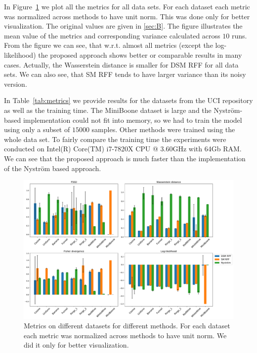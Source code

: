 In Figure~\ref{fig:metrics} we plot all the metrics for all data sets.
For each dataset each metric was normalized across methods to have unit norm.
This was done only for better visualization.
The original values are given in \ref{sec:B}.
The figure illustrates the mean value of the metrics and corresponding variance
calculated across $10$ runs.
From the figure we can see, that w.r.t. almost all metrics (except the log-likelihood)
the proposed approach shows better or comparable results in many cases.
Actually, the Wasserstein distance is smaller for DSM RFF for all data sets.
We can also see, that SM RFF tends to have larger variance than its noisy version.

In Table~\ref{tab:metrics} we provide results for the datasets from the UCI repository
as well as the training time.
The MiniBoone dataset is large and the Nystr\"om-based implementation
could not fit into memory, so we had to train the model using only a subset of
$15000$ samples.
Other methods were trained using the whole data set.
To fairly compare the training time the experiments were conducted on
Intel(R) Core(TM) i7-7820X CPU @ 3.60GHz with 64Gb RAM.
We can see that the proposed approach is much faster than the implementation
of the Nystr\"om based approach.


\begin{figure}[h]
  \centering
  \includegraphics[width=\textwidth]{figures/score_matching/exps/metrics.pdf}
  \caption{Metrics on different datasets for different methods.
           For each dataset each metric was normalized across methods
           to have unit norm.
           We did it only for better visualization.}
  \label{fig:metrics}
\end{figure}

